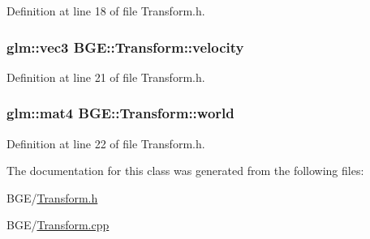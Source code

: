 Definition at line 18 of file Transform.\-h.

\hypertarget{class_b_g_e_1_1_transform_a202d73d14f1c9c756645cb75acfb72de}{
\subsubsection[{velocity}]{\setlength{\rightskip}{0pt plus 5cm}glm\-::vec3 B\-G\-E\-::\-Transform\-::velocity}}\label{class_b_g_e_1_1_transform_a202d73d14f1c9c756645cb75acfb72de}


Definition at line 21 of file Transform.\-h.

\hypertarget{class_b_g_e_1_1_transform_a1111c3693593c94d9d559dab14070b8d}{
\subsubsection[{world}]{\setlength{\rightskip}{0pt plus 5cm}glm\-::mat4 B\-G\-E\-::\-Transform\-::world}}\label{class_b_g_e_1_1_transform_a1111c3693593c94d9d559dab14070b8d}


Definition at line 22 of file Transform.\-h.



The documentation for this class was generated from the following files\-:\begin{DoxyCompactItemize}
\item 
B\-G\-E/\hyperlink{_transform_8h}{Transform.\-h}\item 
B\-G\-E/\hyperlink{_transform_8cpp}{Transform.\-cpp}\end{DoxyCompactItemize}
